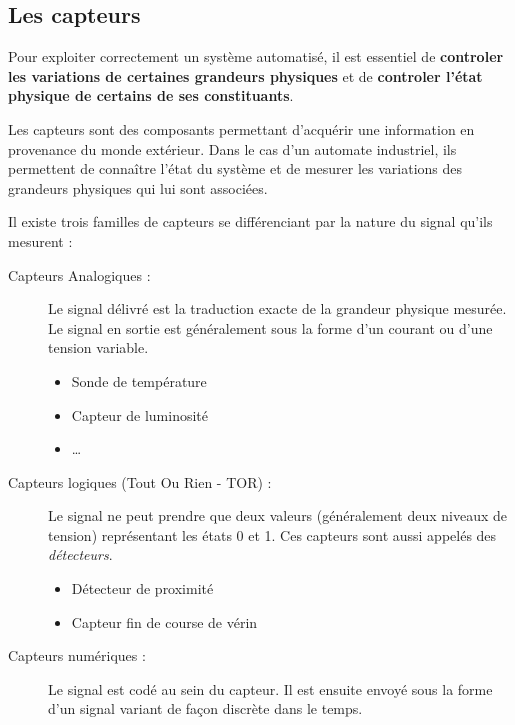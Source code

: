 \subsection{Les capteurs}
Pour exploiter correctement un système automatisé, il est essentiel de \textbf{controler les variations de certaines grandeurs physiques} et de \textbf{controler l'état physique de certains de ses constituants}.

Les capteurs sont des composants permettant d'acquérir une information en provenance du monde extérieur. Dans le cas d'un automate industriel, ils permettent de connaître l'état du système et de mesurer les variations des grandeurs physiques qui lui sont associées.



Il existe trois familles de capteurs se différenciant par la nature du signal qu'ils mesurent :

\begin{description}
	\item [Capteurs Analogiques : ] Le signal délivré est la traduction exacte de la grandeur physique mesurée. Le signal en sortie est généralement sous la forme d'un courant ou d'une tension variable.
		\begin{itemize}
			\item Sonde de température
			\item Capteur de luminosité
			\item \dots
		\end{itemize}

	\item [Capteurs logiques (Tout Ou Rien - TOR) : ] Le signal ne peut prendre que deux valeurs (généralement deux niveaux de tension) représentant les états 0 et 1. Ces capteurs sont aussi appelés des \textit{détecteurs}.
		\begin{itemize}
			\item Détecteur de proximité
			\item Capteur fin de course de vérin
		\end{itemize}

			\item[Capteurs numériques :] Le signal est codé au sein du capteur. Il est ensuite envoyé sous la forme d'un signal variant de façon discrète dans le temps.
\end{description}


